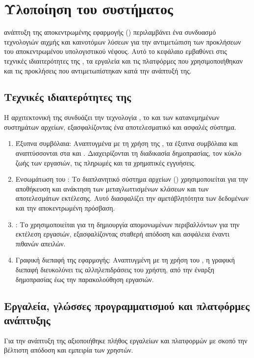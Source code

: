 \chapter{Υλοποίηση του συστήματος}
 ανάπτυξη της αποκεντρωμένης εφαρμογής () περιλαμβάνει ένα συνδυασμό τεχνολογιών αιχμής και καινοτόμων λύσεων για την αντιμετώπιση των προκλήσεων του αποκεντρωμένου υπολογιστικού νέφους. Αυτό το κεφάλαιο εμβαθύνει στις τεχνικές ιδιαιτερότητες της , τα εργαλεία και τις πλατφόρμες που χρησιμοποιήθηκαν και τις προκλήσεις που αντιμετωπίστηκαν κατά την ανάπτυξή της.

\section{Τεχνικές ιδιαιτερότητες της }
Η αρχιτεκτονική της  συνδυάζει την τεχνολογία , το  και των κατανεμημένων συστημάτων αρχείων, εξασφαλίζοντας ένα αποτελεσματικό και ασφαλές σύστημα.

\begin{enumerate}
    \item Έξυπνα συμβόλαια: Αναπτυγμένα με τη χρήση της , τα έξυπνα συμβόλαια  και  αναπτύσσονται στα   και . Διαχειρίζονται τη διαδικασία δημοπρασίας, τον κύκλο ζωής των εργασιών, τις πληρωμές και τα χρηματικές εγγυήσεις.
    \item Ενσωμάτωση του : Το διαπλανητικό σύστημα αρχείων () χρησιμοποιείται για την αποθήκευση και ανάκτηση των μεταγλωττισμένων κλάσεων  και των αποτελεσμάτων εκτέλεσης. Αυτό διασφαλίζει την αμετάβλητότητα των δεδομένων και την αποκεντρωμένη πρόσβαση.
    \item {}: Το  χρησιμοποιείται για τη δημιουργία απομονωμένων περιβαλλόντων για την εκτέλεση εργασιών, εξασφαλίζοντας σταθερή απόδοση και ασφάλεια έναντι πιθανών απειλών.
    \item Γραφική διεπαφή της εφαρμογής: Αναπτυγμένη με τη χρήση του , η γραφική διεπαφή διευκολύνει τις αλληλεπιδράσεις του χρήστη, από την έναρξη δημοπρασίας έως την παρακολούθηση εργασιών.
\end{enumerate}

\section{Εργαλεία, γλώσσες προγραμματισμού και πλατφόρμες ανάπτυξης}
Για την ανάπτυξη της  αξιοποιήθηκε πλήθος εργαλείων και πλατφορμών με σκοπό την βέλτιστη απόδοση και εμπειρία των χρηστών.

